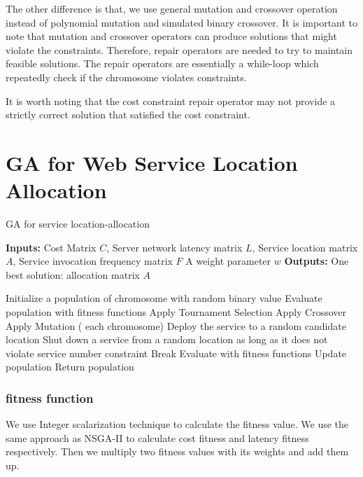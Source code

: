 \documentclass{llncs}
\begin{document}
The other difference is that, we use general mutation and crossover operation instead of polynomial mutation and simulated binary crossover.
It is important to note that mutation and crossover operators can produce solutions that might violate the constraints. 
Therefore, repair operators are needed to try to maintain feasible solutions. The repair operators are essentially a while-loop 
which repeatedly check if the chromosome violates constraints.

It is worth noting that the cost constraint repair operator may not provide a strictly correct solution that satisfied the cost constraint.


\section{GA for Web Service Location Allocation}

\begin{algorithm}[htb]
	\caption{GA for service location-allocation}
	\textbf{Inputs:}
		Cost Matrix $C$,
		Server network latency matrix $L$, 
		Service location matrix $A$, 
		Service invocation frequency matrix $F$
		A weight parameter $w$
	\textbf{Outputs:}
		One best solution: allocation matrix $A$


	\begin{algorithmic}[1]
		\State Initialize a population of chromosome with random binary value
		\State Evaluate population with fitness functions
			\State Apply Tournament Selection
			\State Apply Crossover 
			\State Apply Mutation
			\For( each chromosome)
					\State Deploy the service to a random candidate location
				\EndWhile
					\State Shut down a service from a random location as long as it does not violate service number constraint
					\State Break
					\EndIf
				\EndWhile
			\State Evaluate with fitness functions
		\EndWhile
		\State Update population
		\State Return population
	\end{algorithmic}
\end{algorithm}

\subsubsection{fitness function}
We use Integer scalarization technique to calculate the fitness value. We use the same approach as NSGA-II to calculate
cost fitness and latency fitness respectively. Then we multiply two fitness values with its weights and add them up.
\end{document}
